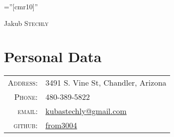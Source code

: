 \documentclass[a4paper,10pt]{article}
\begin{document}

\pagestyle{empty} %

\font\fb=''[cmr10]'' %

\par{\centering
		{\Huge Jakub \textsc{Stechly}
	}\bigskip\par}

\section{Personal Data}

\begin{tabular}{rl}
	\textsc{Address:}	& 3491 S. Vine St, Chandler, Arizona \\
	\textsc{Phone:}		& 480-389-5822\\
	\textsc{email:}		& \href{mailto:kubastechly@gmail.com}{kubastechly@gmail.com}\\
	\textsc{github:}	& \href{https://github.com/from3004}{from3004}\\
\end{tabular}
\end{document}
